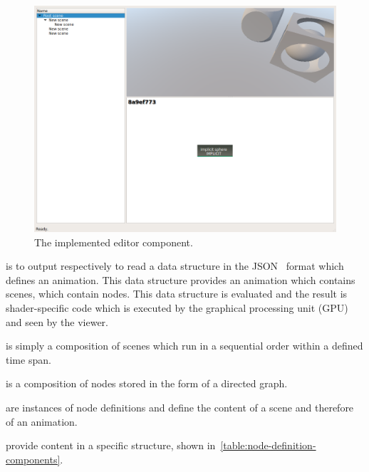 \documentclass[%
    a4paper,    %
    justified,  %
    nobib,      %
    openany     %
]{tufte-book}
\makeatletter
\renewcommand{\label}[1]{\@tufte@label{##1}}%
\makeatother
\begin{document}
\vspace{10mm}

\begin{figure}[!htbp]
  \includegraphics[width=0.95\linewidth]{images/editor}
  \caption{The implemented editor component.}
\label{fig:editor}
\end{figure}

 is to output respectively to
read a data structure in the JSON~\cite{ecma-json-2013} format which defines an
animation. This data structure provides an animation which contains scenes,
which contain nodes. This data structure is evaluated and the result is
shader-specific code which is executed by the graphical processing unit (GPU)
and seen by the viewer.

 is simply a composition of scenes which run in a
sequential order within a defined time span.

 is a composition of nodes stored in the form of a directed
graph.

 are instances of node definitions and define the content of a
scene and therefore of an animation.

 provide content in a specific structure, shown
in~\autoref{table:node-definition-components}.
\end{document}
